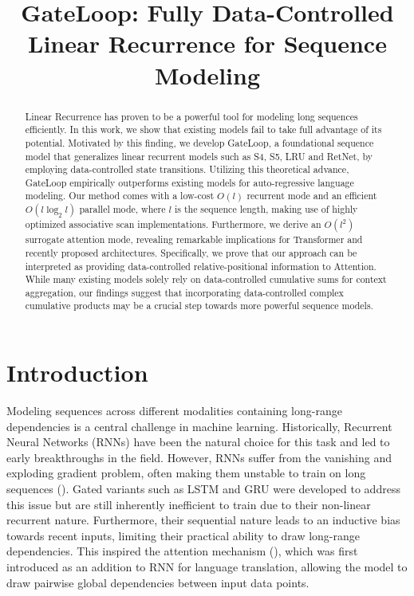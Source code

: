 \title{GateLoop: Fully Data-Controlled Linear Recurrence for Sequence Modeling}

\begin{abstract}
Linear Recurrence has proven to be a powerful tool for modeling long sequences efficiently. In this work, we show that existing models fail to take full advantage of its potential. Motivated by this finding, we develop GateLoop, a foundational sequence model that generalizes linear recurrent models such as S4, S5, LRU and RetNet, by employing data-controlled state transitions. Utilizing this theoretical advance, GateLoop empirically outperforms existing models for auto-regressive language modeling. Our method comes with a low-cost $O(l)$ recurrent mode and an efficient $O(l \log_{2} l)$ parallel mode, where $l$ is the sequence length, making use of highly optimized associative scan implementations. Furthermore, we derive an $O(l^2)$ surrogate attention mode, revealing remarkable implications for Transformer and recently proposed architectures. Specifically, we prove that our approach can be interpreted as providing data-controlled relative-positional information to Attention. While many existing models solely rely on data-controlled cumulative sums for context aggregation, our findings suggest that incorporating data-controlled complex cumulative products may be a crucial step towards more powerful sequence models.
\end{abstract}

\section{Introduction}

Modeling sequences across different modalities containing long-range dependencies is a central challenge in machine learning. Historically, Recurrent Neural Networks (RNNs) have been the natural choice for this task and led to early breakthroughs in the field. However, RNNs suffer from the vanishing and exploding gradient problem, often making them unstable to train on long sequences (\cite{hochreiter1997lstm}). Gated variants such as LSTM and GRU were developed to address this issue but are still inherently inefficient to train due to their non-linear recurrent nature. Furthermore, their sequential nature  leads to an inductive bias towards recent inputs, limiting their practical ability to draw long-range dependencies. This inspired the attention mechanism (\cite{garg2019jointly}), which was first introduced as an addition to RNN for language translation, allowing the model to draw pairwise global dependencies between input data points. 

